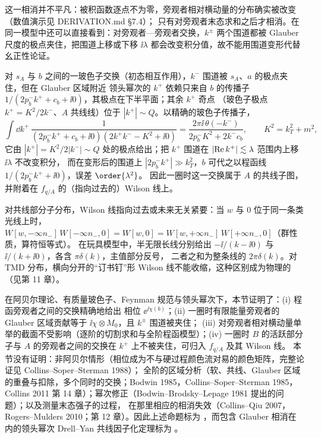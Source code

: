 这一相消并不平凡：被积函数逐点不为零，旁观者相对横动量的分布确实被改变（数值演示见 DERIVATION.md \S7.4）；
只有对旁观者末态求和之后才相消。在同一模型中还可以直接看到：对旁观者—旁观者交换，$k^\pm$ 两个围道都被
Glauber 尺度的极点夹住，把围道上移或下移 $\ii\lambda$ 都会改变积分值，故不能用围道变形代替幺正性论证。

\begin{proposition}\label{prop:dy1l-as}
对 $s_A$ 与 $b$ 之间的一玻色子交换（初态相互作用），$k^-$ 围道被 $s_A$、$a$ 的极点夹住，但在 Glauber 区域附近
领头幂次的 $k^+$ 依赖只来自 $b$ 的传播子 $1/(2p_b^-k^++c_b+\ii0)$，其极点在下半平面；其余 $k^+$ 奇点
（玻色子极点 $k^+=K^2/2k^-$、$A$ 共线线）位于 $|k^+|\sim Q$。以精确的玻色子传播子，
\begin{equation}\label{eq:dy1l-Ias}
\int\dd k^+\,\frac{1}{(2p_b^-k^++c_b+\ii0)(2k^+k^--K^2+\ii0)}=\frac{2\pi\ii\,\theta(-k^-)}{2p_b^-K^2+2k^-c_b},\qquad K^2=k_T^2+m^2,
\end{equation}
它由 $|k^+|=K^2/2|k^-|\sim Q$ 处的极点给出；把 $k^+$ 围道在 $|{\rm Re}\,k^+|\lesssim\lambda$ 范围内上移 $\ii\lambda$ 不改变积分，
而在变形后的围道上 $|2p_b^-k^+|\gg k_T^2$，$b$ 可代之以程函线 $1/(2p_b^-k^++\ii0)$，误差 $\order{\lambda^2}$。
因此一圈时这一交换属于 $A$ 的共线子图，并附着在 $f_{q/A}$ 的（指向过去的）Wilson 线上。
\end{proposition}

对共线部分子分布，Wilson 线指向过去或未来无关紧要：当 $w$ 与 $0$ 位于同一条类光线上时，
$W[w,-\infty n_-]\,W[-\infty n_-,0]=W[w,0]=W[w,+\infty n_-]\,W[+\infty n_-,0]$（群性质，算符恒等式）。
在玩具模型中，半无限长线分别给出 $-\ii/(k-\ii0)$ 与 $\ii/(k+\ii0)$，各含 $\pi\delta(k)$，主值部分反号，
二者之和为整条线的 $2\pi\delta(k)$。对 TMD 分布，横向分开的“订书钉”形 Wilson 线不能收缩，这种区别成为物理的（见第 11 章）。

\begin{remark}\label{rem:dy1l-scope}
在阿贝尔理论、有质量玻色子、Feynman 规范与领头幂次下，本节证明了：(i) 程函旁观者之间的交换精确地给出
相位 $\ee^{\ii\chi(b)}$；(ii) 一圈时有限能量旁观者的 Glauber 区域贡献等于 $\ii\chi\otimes M_0$，且 $k^\pm$ 围道被夹住；
(iii) 对旁观者相对横动量单举的截面不受影响（逐阶的切割求和与全阶程函模型）；(iv) 一圈时 $B$ 的活跃部分子与
$A$ 的旁观者之间的交换在 $k^+$ 上不被夹住，可归入 $f_{q/A}$ 及其 Wilson 线。
本节没有证明：非阿贝尔情形（相位成为不与硬过程颜色流对易的颜色矩阵，完整论证见 Collins--Soper--Sterman 1988）；
全阶的区域分析（软、共线、Glauber 区域的重叠与扣除，多个同时的交换；Bodwin 1985，Collins--Soper--Sterman 1985，
Collins 2011 第 14 章）；幂次修正（Bodwin--Brodsky--Lepage 1981 提出的问题）；以及测量末态强子的过程，
在那里相应的相消失效（Collins--Qiu 2007，Rogers--Mulders 2010；第 12 章）。因此上述命题标为 \tagP，而包含
Glauber 相消在内的领头幂次 Drell--Yan 共线因子化定理标为 \tagA。
\end{remark}
